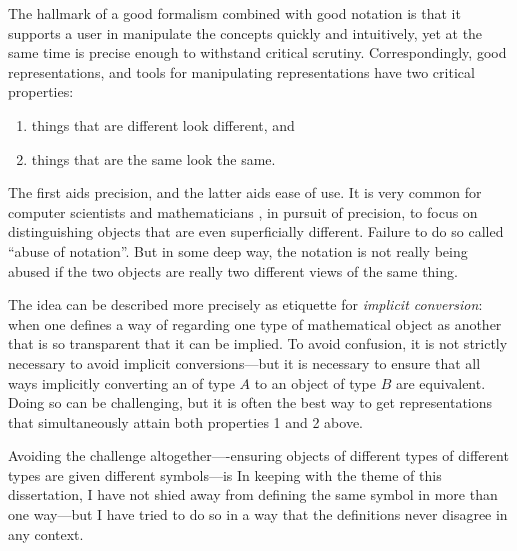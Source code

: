 %
%
The hallmark of a good formalism combined with good notation is that it supports a user in manipulate the concepts quickly and intuitively, yet at the same time is precise enough to withstand critical scrutiny.
%
Correspondingly, good representations, and tools for manipulating representations 
    have two critical properties:
\begin{enumerate}
    \item things that are different look different, and
    \item things that are the same look the same. 
\end{enumerate}
The first aids precision, and the latter aids ease of use. 
It is very common for computer scientists and mathematicians 
    \unskip,
    in pursuit of precision,
    to focus on distinguishing objects that are even superficially different.  
Failure to do so called ``abuse of notation''. 
%
But in some deep way, the notation is not really being abused if the two objects are really two different views of the same thing.

The idea can be described more precisely as etiquette for \emph{implicit conversion}: when one defines a way of regarding one type of mathematical object as another that is so transparent that it can be implied. 
%
To avoid confusion, it is not strictly necessary to avoid implicit conversions---but it is necessary to ensure that all ways implicitly converting an of type $A$ to an object of type $B$ are equivalent. 
%
Doing so can be challenging, but it is often the best way to get representations that simultaneously attain both properties 1 and 2 above. 
%

Avoiding the challenge altogether----ensuring objects of different types of different types are given different symbols---is 
%
%
In keeping with the theme of this dissertation, I have not shied away from defining the same symbol in more than one way---but I have tried to do so in a way that the definitions never disagree in any context. 
%


